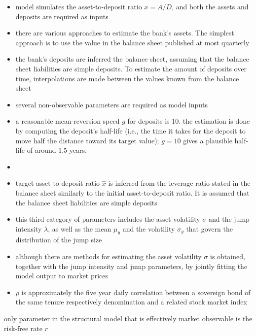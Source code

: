 \begin{itemize}
\item model simulates the asset-to-deposit ratio $x=A/D$, and both the assets and deposits are required as inputs
\item there are various approaches to estimate the bank's assets. The simplest approach is to use the value in the balance sheet published at most quarterly
\item the bank's deposits are inferred the balance sheet, assuming that the balance sheet liabilities are simple deposits. To estimate the amount of deposits over time, interpolations are made between the values known from the balance sheet
\item several non-observable parameters are required as model inputs
\item a reasonable mean-reversion speed $g$ for deposits is 10. the estimation is done by computing the deposit's half-life (i.e., the time it takes for the deposit to move half the distance toward its target value); $g=10$ gives a plausible half-life of around 1.5 years.

\item 
\item target asset-to-deposit ratio $\hat{x}$ is inferred from the leverage ratio stated in the balance sheet similarly to the initial asset-to-deposit ratio. It is assumed that the balance sheet liabilities are simple deposits
\item this third category of parameters includes the asset volatility $\sigma$ and the jump intensity $\lambda$, as well as the mean $\mu_y$ and the volatility $\sigma_y$ that govern the distribution of the jump size  
\item although there are methods for estimating the asset volatility $\sigma$ is obtained, together with the jump intensity and jump parameters, by jointly fitting the model output to market prices
\item $\rho$ is approximately the five year daily correlation between a sovereign bond of the same tenure respectively denomination and a related stock market index 
\end{itemize}



\item only parameter in the structural model that is effectively market observable is the risk-free rate $r$

